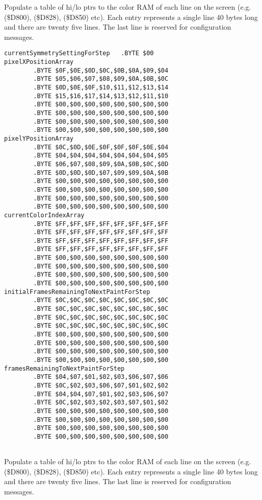 Populate a table of hi/lo ptrs to the color RAM
of each line on the screen (e.g. \icode(\$D800), \icode(\$D828), \icode(\$D850) etc). Each entry represents a single
line 40 bytes long and there are twenty five lines.
The last line is reserved for configuration messages.

\clearpage
\begin{lstlisting}
currentSymmetrySettingForStep   .BYTE $00
pixelXPositionArray   
        .BYTE $0F,$0E,$0D,$0C,$0B,$0A,$09,$04
        .BYTE $05,$06,$07,$08,$09,$0A,$0B,$0C
        .BYTE $0D,$0E,$0F,$10,$11,$12,$13,$14
        .BYTE $15,$16,$17,$14,$13,$12,$11,$10
        .BYTE $00,$00,$00,$00,$00,$00,$00,$00
        .BYTE $00,$00,$00,$00,$00,$00,$00,$00
        .BYTE $00,$00,$00,$00,$00,$00,$00,$00
        .BYTE $00,$00,$00,$00,$00,$00,$00,$00
pixelYPositionArray   
        .BYTE $0C,$0D,$0E,$0F,$0F,$0F,$0E,$04
        .BYTE $04,$04,$04,$04,$04,$04,$04,$05
        .BYTE $06,$07,$08,$09,$0A,$0B,$0C,$0D
        .BYTE $0D,$0D,$0D,$07,$09,$09,$0A,$0B
        .BYTE $00,$00,$00,$00,$00,$00,$00,$00
        .BYTE $00,$00,$00,$00,$00,$00,$00,$00
        .BYTE $00,$00,$00,$00,$00,$00,$00,$00
        .BYTE $00,$00,$00,$00,$00,$00,$00,$00
currentColorIndexArray   
        .BYTE $FF,$FF,$FF,$FF,$FF,$FF,$FF,$FF
        .BYTE $FF,$FF,$FF,$FF,$FF,$FF,$FF,$FF
        .BYTE $FF,$FF,$FF,$FF,$FF,$FF,$FF,$FF
        .BYTE $FF,$FF,$FF,$FF,$FF,$FF,$FF,$FF
        .BYTE $00,$00,$00,$00,$00,$00,$00,$00
        .BYTE $00,$00,$00,$00,$00,$00,$00,$00
        .BYTE $00,$00,$00,$00,$00,$00,$00,$00
        .BYTE $00,$00,$00,$00,$00,$00,$00,$00
initialFramesRemainingToNextPaintForStep   
        .BYTE $0C,$0C,$0C,$0C,$0C,$0C,$0C,$0C
        .BYTE $0C,$0C,$0C,$0C,$0C,$0C,$0C,$0C
        .BYTE $0C,$0C,$0C,$0C,$0C,$0C,$0C,$0C
        .BYTE $0C,$0C,$0C,$0C,$0C,$0C,$0C,$0C
        .BYTE $00,$00,$00,$00,$00,$00,$00,$00
        .BYTE $00,$00,$00,$00,$00,$00,$00,$00
        .BYTE $00,$00,$00,$00,$00,$00,$00,$00
        .BYTE $00,$00,$00,$00,$00,$00,$00,$00
framesRemainingToNextPaintForStep   
        .BYTE $04,$07,$01,$02,$03,$06,$07,$06
        .BYTE $0C,$02,$03,$06,$07,$01,$02,$02
        .BYTE $04,$04,$07,$01,$02,$03,$06,$07
        .BYTE $0C,$02,$03,$02,$03,$07,$01,$02
        .BYTE $00,$00,$00,$00,$00,$00,$00,$00
        .BYTE $00,$00,$00,$00,$00,$00,$00,$00
        .BYTE $00,$00,$00,$00,$00,$00,$00,$00
        .BYTE $00,$00,$00,$00,$00,$00,$00,$00


\end{lstlisting}
\clearpage

Populate a table of hi/lo ptrs to the color RAM
of each line on the screen (e.g. \icode(\$D800), \icode(\$D828), \icode(\$D850) etc). Each entry represents a single
line 40 bytes long and there are twenty five lines.
The last line is reserved for configuration messages.





